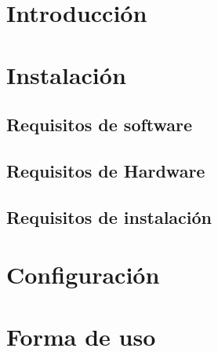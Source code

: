 \documentclass{article}
\begin{document}
\pagestyle{fancy}
\renewcommand{\sectionmark}[1]{\markboth{}{\thesection\ \ #1}}
\chead{}
\rhead{\codMateria - \nombreMateria}
\lfoot{}
\cfoot{\thepage}
\rfoot{}

\newpage

\section{Introducción}
\label{sec:intro}	


\section{Instalación}
\subsection{Requisitos de software}
\label{sec:soft}	


\subsection{Requisitos de Hardware}
\label{sec:hard}	


\subsection{Requisitos de instalación}
\label{sec:install}	


\section{Configuración}
\label{sec:config}


\section{Forma de uso}
\label{sec:uso}

\end{document}
